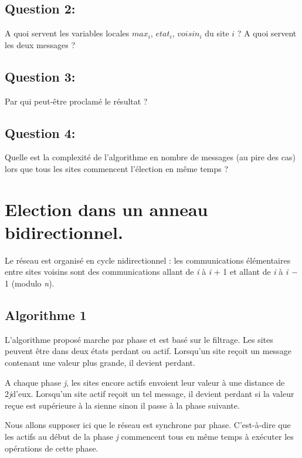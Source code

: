 \documentclass{article}
\begin{document}
\subsection*{Question 2:} A quoi servent les variables locales $max_i$, $etat_i$, $voisin_i$ du site $i$ ? A quoi servent les deux messages ?

\subsection*{Question 3:} Par qui peut-être proclamé le résultat ?

\subsection*{Question 4:} Quelle est la complexité de l'algorithme en nombre de messages (au pire des cas) lors que tous les sites commencent l'élection en même temps ?


\section*{Election dans un anneau bidirectionnel.}

Le réseau est organisé en cycle nidirectionnel : les communications
élémentaires entre sites voisins sont des communications allant de
\emph{i} à \emph{i} + 1 et allant de \emph{i} à \emph{i −} 1 (modulo
\emph{n}).

\subsection*{Algorithme 1}

L'algorithme proposé marche par phase et est basé sur le filtrage. Les
sites peuvent être dans deux états perdant ou actif. Lorsqu'un site
reçoit un message contenant une valeur plus grande, il devient perdant.

A chaque phase \emph{j}, les sites encore actifs envoient leur valeur à
une distance de 2\emph{j}d'eux. Lorsqu'un site actif reçoit un tel
message, il devient perdant si la valeur reçue est supérieure à la
sienne sinon il passe à la phase suivante.

Nous allons supposer ici que le réseau est synchrone par phase.
C'est-à-dire que les actifs au début de la phase \emph{j} commencent
tous en même temps à exécuter les opérations de cette phase.
\end{document}
